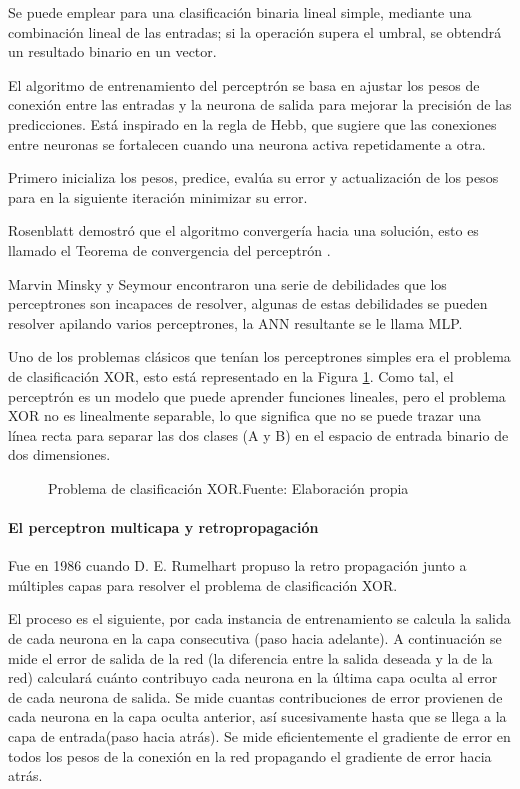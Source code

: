 Se puede emplear para una clasificación binaria lineal simple, mediante una combinación lineal de las entradas; si la operación supera el umbral, se obtendrá un resultado binario en un vector.

El algoritmo de entrenamiento del perceptrón se basa en ajustar los pesos de conexión entre las entradas y la neurona de salida para mejorar la precisión de las predicciones. Está inspirado en la regla de Hebb, que sugiere que las conexiones entre neuronas se fortalecen cuando una neurona activa repetidamente a otra.

Primero inicializa los pesos, predice, evalúa su error y actualización de los pesos para en la siguiente iteración minimizar su error.

Rosenblatt demostró que el algoritmo convergería hacia una solución, esto es llamado el Teorema de convergencia del perceptrón \cite{geron2018neural}.

Marvin Minsky y Seymour encontraron una serie de debilidades que los perceptrones son incapaces de resolver, algunas de estas debilidades se pueden resolver apilando varios perceptrones, la \acrshort{ANN} resultante se le llama \gls{MLP}.

Uno de los problemas clásicos que tenían los perceptrones simples era el problema de clasificación XOR, esto está representado en la Figura \ref{fig:problem-xor}. Como tal, el perceptrón es un modelo que puede aprender funciones lineales, pero el problema XOR no es linealmente separable, lo que significa que no se puede trazar una línea recta para separar las dos clases (A y B) en el espacio de entrada binario de dos dimensiones.

\begin{figure}[H]
    \centering
    \centerline{}
    \caption{Problema de clasificación XOR.\newline{}Fuente: Elaboración propia}
    \label{fig:problem-xor}
\end{figure}


\paragraph*{El perceptron multicapa y retropropagación}

Fue en 1986 cuando {D. E. Rumelhart} propuso la retro propagación junto a múltiples capas para resolver el problema de clasificación XOR.

El proceso es el siguiente, por cada instancia de entrenamiento se calcula la salida de cada neurona en la capa consecutiva (paso hacia adelante). A continuación se mide el error de salida de la red (la diferencia entre la salida deseada y la de la red) calculará cuánto contribuyo cada neurona en la última capa oculta al error de cada neurona de salida. Se mide cuantas contribuciones de error provienen de cada neurona en la capa oculta anterior, así sucesivamente hasta que se llega a la capa de entrada(paso hacia atrás). Se mide eficientemente el gradiente de error en todos los pesos de la conexión en la red propagando el gradiente de error hacia atrás. \cite{geron2018neural}

